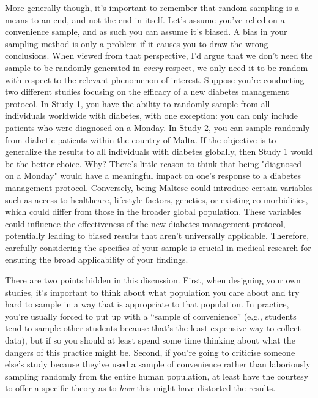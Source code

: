 More generally though, it's important to remember that random sampling is a means to an end, and not the end in itself. Let's assume you've relied on a convenience sample, and as such you can assume it's biased. A bias in your sampling method is only a problem if it causes you to draw the wrong conclusions. When viewed from that perspective, I'd argue that we don't need the sample to be randomly generated in {\it every} respect, we only need it to be random with respect to the relevant phenomenon of interest. Suppose you're conducting two different studies focusing on the efficacy of a new diabetes management protocol. In Study 1, you have the ability to randomly sample from all individuals worldwide with diabetes, with one exception: you can only include patients who were diagnosed on a Monday. In Study 2, you can sample randomly from diabetic patients within the country of Malta. If the objective is to generalize the results to all individuals with diabetes globally, then Study 1 would be the better choice. Why? There's little reason to think that being "diagnosed on a Monday" would have a meaningful impact on one's response to a diabetes management protocol. Conversely, being Maltese could introduce certain variables such as access to healthcare, lifestyle factors, genetics, or existing co-morbidities, which could differ from those in the broader global population. These variables could influence the effectiveness of the new diabetes management protocol, potentially leading to biased results that aren't universally applicable. Therefore, carefully considering the specifics of your sample is crucial in medical research for ensuring the broad applicability of your findings. 

There are two points hidden in this discussion. First, when designing your own studies, it's important to think about what population you care about and try hard to sample in a way that is appropriate to that population. In practice, you're usually forced to put up with a ``sample of convenience'' (e.g., students tend to sample other students because that's the least expensive way to collect data), but if so you should at least spend some time thinking about what the dangers of this practice might be. Second, if you're going to criticise someone else's study because they've used a sample of convenience rather than laboriously sampling randomly from the entire human population, at least have the courtesy to offer a specific theory as to {\it how} this might have distorted the results. 


